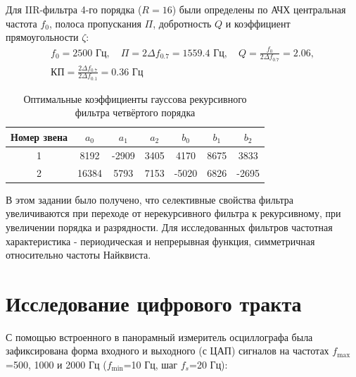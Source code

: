 \documentclass[a4paper,14pt]{extarticle}
\begin{document}
Для IIR-фильтра 4-го порядка ($R=16$) были определены по АЧХ центральная частота $f_0$, полоса пропускания $\Pi$, добротность $Q$ и коэффициент прямоугольности $\zeta$:
\begin{gather}
  f_0=2500 \text{ Гц}, \quad
  \Pi=2\Delta f_{0.7} =1559.4 \text{ Гц}, \quad
  Q=\frac{f_0}{2\Delta f_{0.7}}=2.06, \\
  \text{КП}=\frac{2\Delta f_{0.7}}{2\Delta f_{0.1}}=0.36 \text{ Гц}
\end{gather}


\begin{table}[H]
\centering
\caption{Оптимальные  коэффициенты  гауссова  рекурсивного  фильтра  четвёртого порядка}
\vspace{0.5em}
\begin{tabular}{|c|c|c|c|c|c|c|}
\hline
Номер звена & $a_0$ & $a_1$ & $a_2$ & $b_0$ & $b_1$ & $b_2$ \\ \hline
1           & 8192    & -2909   & 3405    & 4170    & 8675    & 3833    \\ \hline
2           & 16384   & 5793    & 7153    & -5020   & 6826    & -2695   \\ \hline
\end{tabular}
\end{table}

В этом задании было получено, что селективные свойства фильтра увеличиваются при переходе от нерекурсивного фильтра к рекурсивному, при увеличении порядка и разрядности. Для исследованных фильтров частотная характеристика - периодическая и непрерывная функция, симметричная относительно частоты Найквиста. 




\newpage
\section{Исследование цифрового тракта}

С помощью встроенного в панорамный измеритель осциллографа была зафиксирована форма
входного и выходного (с ЦАП) сигналов на частотах $f_{\max}$=500, 1000 и 2000 Гц ($f_{\min}$=10 Гц, шаг $f_s$=20 Гц):
\end{document}

